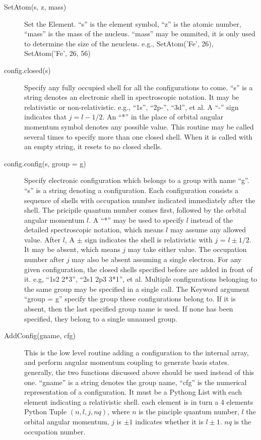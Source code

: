 \documentclass[12pt]{article}
\begin{document}
\begin{description}
\item[SetAtom(s, z, mass)] 
Set the Element. ``s'' is the element symbol, ``z'' is
the atomic number, ``mass'' is the mass of the nucleus. ``mass'' may be
ommited, it is only used to determine the size of the neucleus. e.g.,
SetAtom('Fe', 26), SetAtom('Fe', 26, 56)

\item[config.closed(s)] 
Specify any fully occupied shell for all the
configurations to come. ``s'' is a string denotes an electronic shell in
spectroscopic notation. It may be relativistic or non-relativistic. e.g., 
``1s'', ``2p-'', ``3d'', et al. A ``-'' sign indicates that $j = l - 1/2$. 
An ``*'' in the place of orbital angular momentum symbol denotes any possible
value. This routine may be called several times to specify more than one closed
shell. When it is called with an empty string, it resets to no closed shells. 

\item[config.config(s, group = g)] 
Specify electronic configuration which
belongs to a group with name ``g''. ``s'' is a string denoting a
configuration. Each configuration consists a sequence of shells with
occupation number indicated immediately after the shell. The pricipile quantum
number comes first, followed by the orbital angular momentum $l$. A ``*'' may
be used to specify $l$ instead of the detailed spectroscopic notation, which
means $l$ may assume any allowed value. After $l$,  A $\pm$ sign
indicates the shell is relativistic with $j$ = $l\pm 1/2$. It may be absent,
which means $j$ may take either value. The occupation number after $j$ may
also be absent assuming a single electron. For any given configuration, the
closed shells specified before are added in front of it. e.g, ``1s2 2*3'', 
``2s1 2p3 3*1'', et al. Multiple configurations belonging to the same group
may be specified in a single call. The Keyword argument ``group = g'' specify
the group these configurations belong to. If it is absent, 
then the last specified group name is used. If none has been specified, they
belong to a single unnamed group. 

\item[AddConfig(gname, cfg)] 
This is the low level routine adding a
configuration to the internal array, and perform angular momentum coupling to
generate basis states. generally, the two functions discussed above should be
used instead of this one. ``gname'' is a string denotes the group name, 
``cfg'' is the numerical representation of a configuration. It must be a
Pythong List with 
each element indicating a relativistic shell. each element is in turn a 4
elements Python Tuple $(n, l, j, nq)$, where $n$ is the pinciple quantum
number, $l$ the orbital angular momentum, $j$ is $\pm 1$ indicates whether it
is $l\pm 1$. $nq$ is the occupation number.

\end{description}
\end{document}
